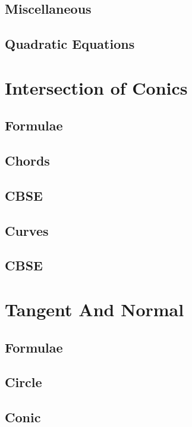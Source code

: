 \documentclass[journal]{IEEEtran}
\begin{document}
\subsection{Miscellaneous}

\subsection{Quadratic Equations}

\newpage
\section{Intersection of Conics}
\subsection{Formulae}

\subsection{Chords}

\subsection{CBSE}

\subsection{Curves}

\subsection{CBSE}


\newpage
\section{Tangent And Normal}
\subsection{Formulae}

\subsection{Circle}

\subsection{Conic}

\end{document}
